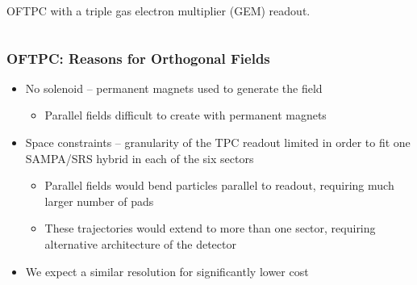 \documentclass{beamer}
\begin{document}
\begin{frame}
\begin{columns}
\begin{minipage}[t][4.05cm]{\textwidth}
				\end{minipage}
				OFTPC with a triple gas electron multiplier (GEM) readout.~\cite{poster}
		\end{columns}
	\end{frame}

	\begin{frame}
		\frametitle{OFTPC: Reasons for Orthogonal Fields}
		\begin{itemize}
			\item No solenoid -- permanent magnets used to generate the field
			\begin{itemize}
				\item Parallel fields difficult to create with permanent magnets
			\end{itemize}
			\item Space constraints -- granularity of the TPC readout limited in order to fit one SAMPA/SRS hybrid in each of the six sectors
			\begin{itemize}
				\item Parallel fields would bend particles parallel to readout, requiring much larger number of pads
				\item These trajectories would extend to more than one sector, requiring alternative architecture of the detector
			\end{itemize}
			\item We expect a similar resolution for significantly lower cost
		\end{itemize}
	\end{frame}
	
\end{document}

